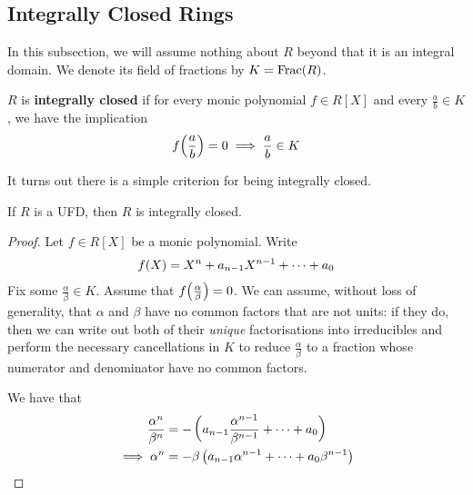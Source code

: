 \subsection{Integrally Closed Rings}

In this subsection, we will assume nothing about $R$ beyond that it is an integral domain. We denote its field of fractions by $K = \operatorname{Frac}\!\left( R \right)$.

\begin{boxdefinition}
    $R$ is \textbf{integrally closed} if for every monic polynomial $f \in R[X]$ and every $\frac{a}{b} \in K$, we have the implication
    \begin{align*}
        f\!\left( \frac{a}{b} \right) = 0 \implies \frac{a}{b} \in K
    \end{align*}
\end{boxdefinition}

It turns out there is a simple criterion for being integrally closed.

\begin{boxproposition}
    If $R$ is a UFD, then $R$ is integrally closed.
\end{boxproposition}
\begin{proof}
    Let $f \in R[X]$ be a monic polynomial. Write
    \begin{align*}
        f\!\left( X \right) = X^n + a_{n-1} X^{n-1} + \cdots + a_0
    \end{align*}
    Fix some $\frac{\alpha}{\beta} \in K$. Assume that $f\!\left( \frac{\alpha}{\beta} \right) = 0$. We can assume, without loss of generality, that $\alpha$ and $\beta$ have no common factors that are not units: if they do, then we can write out both of their \textit{unique} factorisations into irreducibles and perform the necessary cancellations in $K$ to reduce $\frac{\alpha}{\beta}$ to a fraction whose numerator and denominator have no common factors.

    We have that
    \begin{align*}
        \frac{\alpha^n}{\beta^n} &= -\left( a_{n-1}\frac{\alpha^{n-1}}{\beta^{n-1}} + \cdots + a_0 \right) \\
        \implies \alpha^n &= -\beta\left( a_{n-1}\alpha^{n-1} + \cdots + a_0 \beta^{n-1} \right)
    \end{align*}
\end{proof}